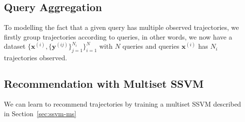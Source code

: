 \subsection{Query Aggregation}
\label{sec:query}

To modelling the fact that a given query has multiple observed trajectories, 
we firstly group trajectories according to queries, in other words,
we now have a dataset $\{\mathbf{x}^{(i)}, \{\mathbf{y}^{(ij)}\}_{j=1}^{N_i}\}_{i=1}^N$
with $N$ queries and queries $\mathbf{x}^{(i)}$ has $N_i$ trajectories observed.


\subsection{Recommendation with Multiset SSVM}
\label{sec:trajrec-ssvm}

We can learn to recommend trajectories by training a multiset SSVM described in Section~\ref{sec:ssvm-ms}




